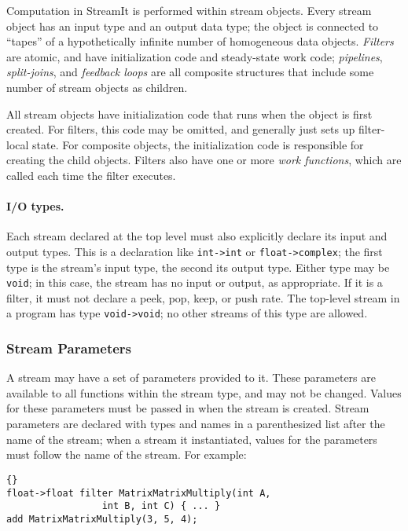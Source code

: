 \documentclass[11pt]{article}
\begin{document}
Computation in StreamIt is performed within stream objects.  Every
stream object has an input type and an output data type; the object is
connected to ``tapes'' of a hypothetically infinite number of
homogeneous data objects.  \emph{Filters} are atomic, and have
initialization code and steady-state work code; \emph{pipelines},
\emph{split-joins}, and \emph{feedback loops} are all composite
structures that include some number of stream objects as children.

All stream objects have initialization code that runs when the object
is first created.  For filters, this code may be omitted, and
generally just sets up filter-local state.  For composite objects, the
initialization code is responsible for creating the child objects.
Filters also have one or more \emph{work functions}, which are called
each time the filter executes.

\paragraph{I/O types.}  Each stream declared at the top level must
also explicitly declare its input and output types.  This is a
declaration like \lstinline|int->int| or \lstinline|float->complex|;
the first type is the stream's input type, the second its output type.
Either type may be \lstinline|void|; in this case, the stream has no
input or output, as appropriate.  If it is a filter, it must not
declare a peek, pop, keep, or push rate.  The top-level stream in a
program has type \lstinline|void->void|; no other streams of this type
are allowed.

\subsubsection{Stream Parameters}

A stream may have a set of parameters provided to it.  These
parameters are available to all functions within the stream type, and
may not be changed.  Values for these parameters must be passed in
when the stream is created.  Stream parameters are declared with types
and names in a parenthesized list after the name of the stream; when a
stream it instantiated, values for the parameters must follow the name
of the stream.  For example:

\begin{lstlisting}{}
float->float filter MatrixMatrixMultiply(int A,
                 int B, int C) { ... }
add MatrixMatrixMultiply(3, 5, 4);
\end{lstlisting}
\end{document}

